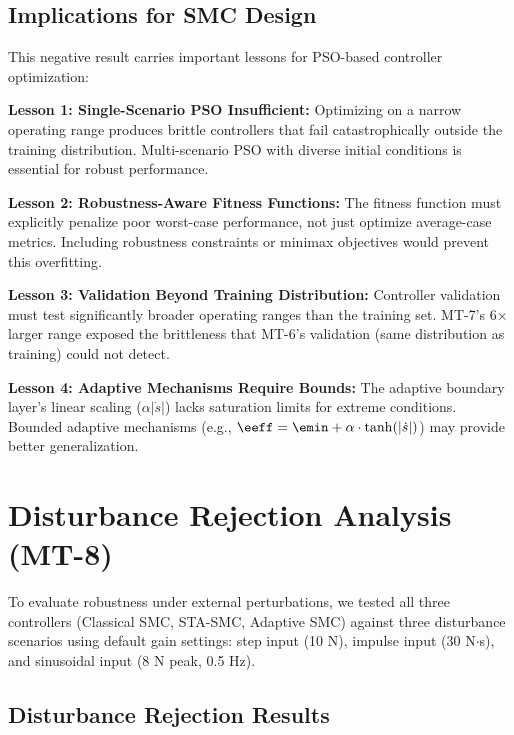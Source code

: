 \subsection{Implications for SMC Design}
\label{subsec:mt7_implications}

This negative result carries important lessons for PSO-based controller optimization:

\textbf{Lesson 1: Single-Scenario PSO Insufficient:} Optimizing on a narrow operating range produces brittle controllers that fail catastrophically outside the training distribution. Multi-scenario PSO with diverse initial conditions is essential for robust performance.

\textbf{Lesson 2: Robustness-Aware Fitness Functions:} The fitness function must explicitly penalize poor worst-case performance, not just optimize average-case metrics. Including robustness constraints or minimax objectives would prevent this overfitting.

\textbf{Lesson 3: Validation Beyond Training Distribution:} Controller validation must test significantly broader operating ranges than the training set. MT-7's 6$\times$ larger range exposed the brittleness that MT-6's validation (same distribution as training) could not detect.

\textbf{Lesson 4: Adaptive Mechanisms Require Bounds:} The adaptive boundary layer's linear scaling ($\alpha|\dot{s}|$) lacks saturation limits for extreme conditions. Bounded adaptive mechanisms (e.g., $\eeff = \emin + \alpha \cdot \tanh(|\dot{s}|)$) may provide better generalization.

\section{Disturbance Rejection Analysis (MT-8)}
\label{sec:mt8_disturbance}

To evaluate robustness under external perturbations, we tested all three controllers (Classical SMC, STA-SMC, Adaptive SMC) against three disturbance scenarios using default gain settings: step input (10 N), impulse input (30 N$\cdot$s), and sinusoidal input (8 N peak, 0.5 Hz).

\subsection{Disturbance Rejection Results}
\label{subsec:mt8_results}

